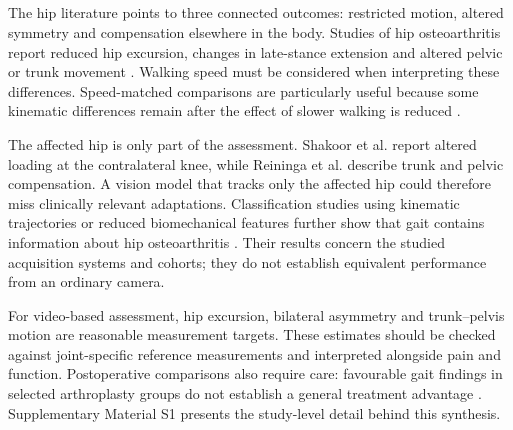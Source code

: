 \documentclass[12pt,nopreprintline]{elsarticle}
\begin{document}
\subsection{}
\label{sec:hip_synthesis}
\begin{revision}
The hip literature points to three connected outcomes: restricted motion, altered symmetry and compensation elsewhere in the body. Studies of hip osteoarthritis report reduced hip excursion, changes in late-stance extension and altered pelvic or trunk movement \cite{kiss2010effect,eitzen2012sagittal,reininga2012subjects,ismailidis2021kinematic}. Walking speed must be considered when interpreting these differences. Speed-matched comparisons are particularly useful because some kinematic differences remain after the effect of slower walking is reduced \cite{ismailidis2021kinematic}.

The affected hip is only part of the assessment. Shakoor et al. \cite{shakoor2003asymmetric} report altered loading at the contralateral knee, while Reininga et al. \cite{reininga2012subjects} describe trunk and pelvic compensation. A vision model that tracks only the affected hip could therefore miss clinically relevant adaptations. Classification studies using kinematic trajectories or reduced biomechanical features further show that gait contains information about hip osteoarthritis \cite{laroche2014classification,meyer2015biomechanical}. Their results concern the studied acquisition systems and cohorts; they do not establish equivalent performance from an ordinary camera.

For video-based assessment, hip excursion, bilateral asymmetry and trunk--pelvis motion are reasonable measurement targets. These estimates should be checked against joint-specific reference measurements and interpreted alongside pain and function. Postoperative comparisons also require care: favourable gait findings in selected arthroplasty groups do not establish a general treatment advantage \cite{mont2007gait}. Supplementary Material S1 presents the study-level detail behind this synthesis.
\end{revision}
\end{document}
